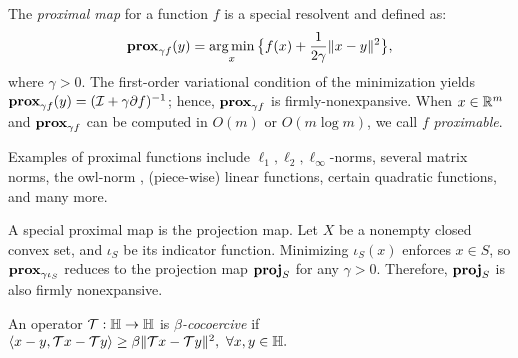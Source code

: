 \begin{definition}\label{def-prox-map}
The \emph{proximal map} for a function $f$ is a special resolvent and defined as:
\begin{equation}\label{def-prox}\prox_{\gamma f}(y) = \argmin_x \big\{f(x)+\frac{1}{2\gamma}\|x-y\|^2 \big\},
\end{equation}
where $\gamma > 0$. The first-order variational condition of the minimization yields $\mathbf{prox}_{\gamma f}(y)=({\mathcal{I}}+\gamma\partial f)^{-1}$; hence, $\mathbf{prox}_{\gamma f}$ is firmly-nonexpansive. When $x\in\mathbb{R}^m$ and $\mathbf{prox}_{\gamma f}$ can be computed in $O(m)$ or $O(m\log m)$, we call $f$ \emph{proximable}.

Examples of proximal functions include $\ell_1,\ell_2,\ell_\infty$-norms, several matrix norms, the owl-norm \cite{davis2015n}, (piece-wise) linear functions, certain quadratic functions, and many more.
\end{definition}

\begin{example}
 A special proximal map is the projection map. Let $X$ be a nonempty closed convex set, and $\iota_S$ be its indicator function. Minimizing $\iota_S(x)$  enforces $x\in S$,  so $\mathbf{prox}_{\gamma \iota_S}$ reduces to the projection map ${\mathbf{proj}}_{S}$ for any $\gamma>0$. Therefore, ${\mathbf{proj}}_{S}$ is also firmly nonexpansive.
 \end{example}


\begin{definition}
An operator ${\mathcal{T}}:\mathbb{H}\to\mathbb{H}$ is \emph{$\beta$-cocoercive} if 
$\langle x-y, {\mathcal{T}} x-{\mathcal{T}} y\rangle \ge \beta \|{\mathcal{T}} x-{\mathcal{T}} y\|^2,\ \forall x,y\in\mathbb{H}.$ 
\end{definition}

